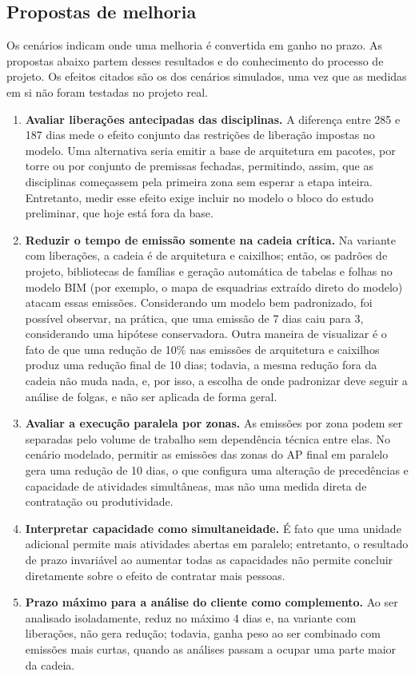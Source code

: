 \subsection{Propostas de melhoria}
\label{sec:propostas}

Os cenários indicam onde uma melhoria é convertida em ganho no prazo. As propostas abaixo
partem desses resultados e do conhecimento do processo de projeto. Os
efeitos citados são os dos cenários simulados, uma vez que as medidas em si não foram testadas
no projeto real.

\begin{enumerate}
  \item \textbf{Avaliar liberações antecipadas das disciplinas.} A
    diferença entre 285 e 187 dias mede o efeito conjunto das restrições
    de liberação impostas no modelo. Uma alternativa seria emitir a base de arquitetura em
    pacotes, por torre ou por
    conjunto de premissas fechadas, permitindo, assim, que as disciplinas
    começassem pela primeira zona sem esperar a etapa inteira. Entretanto, medir esse
    efeito exige incluir no modelo o bloco do estudo preliminar, que hoje
    está fora da base.
  \item \textbf{Reduzir o tempo de emissão somente na cadeia crítica.}
    Na variante com liberações, a cadeia é de arquitetura e caixilhos; então, os padrões de
    projeto, bibliotecas de famílias e geração automática de tabelas e
    folhas no modelo BIM (por exemplo, o mapa de esquadrias extraído
    direto do modelo) atacam essas emissões. Considerando um modelo bem padronizado,
    foi possível observar, na prática, que uma emissão de 7 dias caiu para 3, considerando uma hipótese conservadora. Outra maneira de visualizar é o fato de que uma redução de 10\% nas emissões de arquitetura e caixilhos produz uma redução final de 10 dias; todavia, a mesma redução fora da cadeia não muda nada, e, por isso, a escolha de onde padronizar deve seguir a análise de
    folgas, e não ser aplicada de forma geral.
  \item \textbf{Avaliar a execução paralela por zonas.} As emissões por
    zona podem ser separadas pelo volume de trabalho sem dependência
    técnica entre elas. No cenário modelado, permitir as emissões das zonas
    do AP final em paralelo gera uma redução de 10 dias, o que configura uma alteração de
    precedências e capacidade de atividades simultâneas, mas não uma medida
    direta de contratação ou produtividade.
  \item \textbf{Interpretar capacidade como simultaneidade.} É fato que uma unidade
    adicional permite mais atividades abertas em paralelo; entretanto, o resultado de
    prazo invariável ao aumentar todas as capacidades não permite concluir
    diretamente sobre o efeito de contratar mais pessoas.
  \item \textbf{Prazo máximo para a análise do cliente como complemento.} Ao ser analisado isoladamente, reduz no máximo 4 dias e, na variante com liberações, não gera redução; todavia, ganha peso ao ser combinado com emissões mais curtas, quando as análises passam a ocupar uma parte maior da cadeia.
\end{enumerate}

